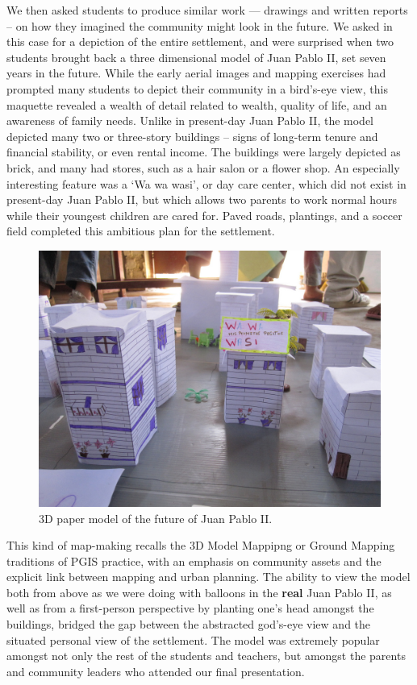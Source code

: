 \documentclass[11pt]{report}
\begin{document}
We then asked students to produce similar work --- drawings and written reports -- on how they imagined the community might look in the future. We asked in this case for a depiction of the entire settlement, and were surprised when two students brought back a three dimensional model of Juan Pablo II, set seven years in the future. While the early aerial images and mapping exercises had prompted many students to depict their community in a bird's-eye view, this maquette revealed a wealth of detail related to wealth, quality of life, and an awareness of family needs. Unlike in present-day Juan Pablo II, the model depicted many two or three-story buildings -- signs of long-term tenure and financial stability, or even rental income. The buildings were largely depicted as brick, and many had stores, such as a hair salon or a flower shop. An especially interesting feature was a `Wa wa wasi', or day care center, which did not exist in present-day Juan Pablo II, but which allows two parents to work normal hours while their youngest children are cared for. Paved roads, plantings, and a soccer field completed this ambitious plan for the settlement.

\begin{figure}[h]
  \begin{center}
	\includegraphics[width=1\textwidth]{images/juan-pablo-maqueta.jpg}
	\caption{3D paper model of the future of Juan Pablo II.}
  \end{center}
\end{figure}

This kind of map-making recalls the 3D Model Mappipng or Ground Mapping traditions of PGIS practice, with an emphasis on community assets and the explicit link between mapping and urban planning. The ability to view the model both from above as we were doing with balloons in the \textbf{real} Juan Pablo II, as well as from a first-person perspective by planting one's head amongst the buildings, bridged the gap between the abstracted god's-eye view and the situated personal view of the settlement. The model was extremely popular amongst not only the rest of the students and teachers, but amongst the parents and community leaders who attended our final presentation. 
\end{document}
